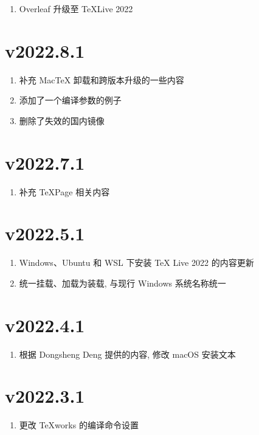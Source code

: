 \begin{enumerate}
  \item Overleaf 升级至 \TeX Live 2022
\end{enumerate}

\section*{v2022.8.1}

\begin{enumerate}
  \item 补充 Mac\TeX{} 卸载和跨版本升级的一些内容
  \item 添加了一个编译参数的例子
  \item 删除了失效的国内镜像
\end{enumerate}

\section*{v2022.7.1}

\begin{enumerate}
  \item 补充 TeXPage 相关内容
\end{enumerate}

\section*{v2022.5.1}

\begin{enumerate}
  \item Windows、Ubuntu 和 WSL 下安装 \TeX{} Live 2022 的内容更新
  \item 统一挂载、加载为装载, 与现行 Windows 系统名称统一
\end{enumerate}

\section*{v2022.4.1}

\begin{enumerate}
  \item 根据 Dongsheng Deng 提供的内容, 修改 macOS 安装文本
\end{enumerate}

\section*{v2022.3.1}

\begin{enumerate}
  \item 更改 \TeX works 的编译命令设置
\end{enumerate}

